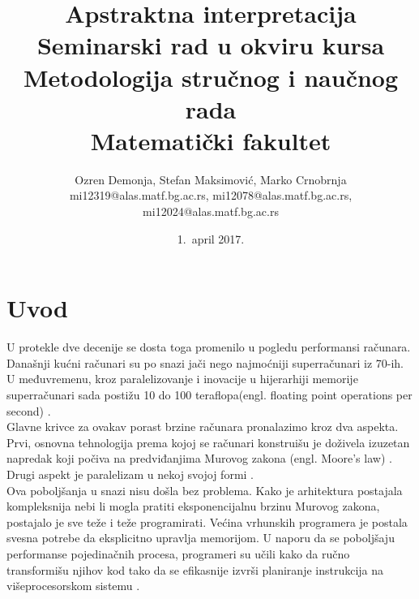\documentclass[a4paper]{article}
\begin{document}
\title{Apstraktna interpretacija\\ \small{Seminarski rad u okviru kursa\\Metodologija stručnog i naučnog rada\\ Matematički fakultet}}

\author{Ozren Demonja, Stefan Maksimović, Marko Crnobrnja\\ mi12319@alas.matf.bg.ac.rs, mi12078@alas.matf.bg.ac.rs, mi12024@alas.matf.bg.ac.rs}
\date{1.~april 2017.}
\maketitle


\tableofcontents

\newpage

\section{Uvod}
\label{sec:uvod}
U protekle dve decenije se dosta toga promenilo u pogledu performansi računara. Današnji kućni računari su po snazi jači nego najmoćniji superračunari iz 70-ih. U međuvremenu, kroz paralelizovanje i inovacije u hijerarhiji memorije superračunari sada postižu 10 do 100 teraflopa(engl. floating point operations per second) \cite{allen2001optimizing}. \\

Glavne krivce za ovakav porast brzine računara pronalazimo kroz dva aspekta. Prvi, osnovna tehnologija prema kojoj se računari konstruišu je doživela izuzetan napredak koji počiva na predviđanjima Murovog zakona (engl. Moore's law) \cite{Schaller1997MooresLaw}. Drugi aspekt je paralelizam u nekoj svojoj formi \cite{allen2001optimizing}.  \\

Ova poboljšanja u snazi nisu došla bez problema. Kako je arhitektura postajala kompleksnija nebi li mogla pratiti eksponencijalnu brzinu Murovog zakona, postajalo je sve teže i teže programirati. Većina vrhunskih programera je postala svesna potrebe da eksplicitno upravlja memorijom. U naporu da se poboljšaju performanse pojedinačnih procesa, programeri su učili kako da ručno transformišu njihov kod tako da se efikasnije izvrši planiranje instrukcija na višeprocesorskom sistemu \cite{allen2001optimizing}. \\
\end{document}
